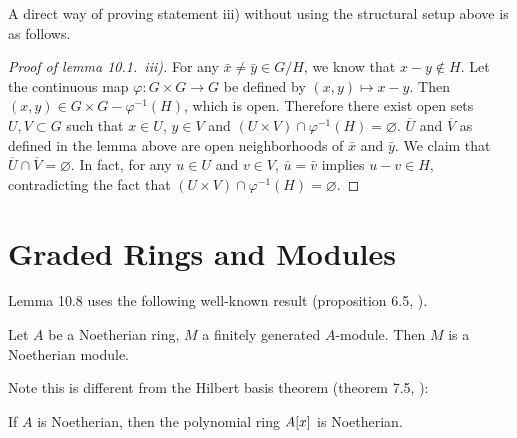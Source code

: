 \documentclass{note}
\begin{document}
A direct way of proving statement iii) without using the structural setup above is
as follows.

\begin{proof}[Proof of lemma 10.1.~iii)] For any
  $\bar{x} \neq \bar{y} \in G/H$, we know that $x - y \notin H$. Let
  the continuous map $\varphi\colon G\times G \to G$ be defined by $(x,y) \mapsto
    x - y$. Then $(x,y) \in G\times G - \varphi^{-1}(H)$, which is open. Therefore
  there exist open sets $U,V \subset G$ such that $x\in U$, $y\in V$ and
  $(U\times V) \cap \varphi^{-1}(H) = \varnothing$. $\overline{U}$ and
  $\overline{V}$ as defined in the lemma above are open neighborhoods of
  $\bar{x}$ and $\bar{y}$. We claim that $\overline{U} \cap \overline{V} =
    \varnothing$. In fact, for any $u\in U$ and $v\in V$, $\bar{u} = \bar{v}$
  implies $u - v \in H$, contradicting the fact that $(U\times V) \cap
    \varphi^{-1}(H) = \varnothing$.
\end{proof}

\section*{Graded Rings and Modules}



Lemma 10.8 uses the following well-known result (proposition 6.5, ).
\begin{proposition*}
  Let $A$ be a Noetherian ring, $M$ a finitely generated $A$-module. Then $M$ is
  a Noetherian module.
\end{proposition*}
Note this is different from the Hilbert basis theorem (theorem 7.5, ):
\begin{theorem*}
  If $A$ is Noetherian, then the polynomial ring $\polynomials{A}{x}$ is
  Noetherian.
\end{theorem*}
\end{document}
